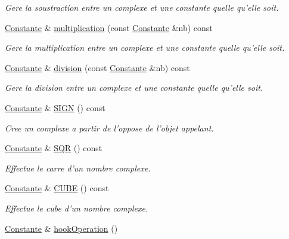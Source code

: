 \begin{DoxyCompactItemize}
\begin{DoxyCompactList}\small\item\em \-Gere la soustraction entre un complexe et une constante quelle qu'elle soit. \end{DoxyCompactList}\item 
\hyperlink{class_l_o21_1_1_constante}{\-Constante} \& \hyperlink{class_l_o21_1_1_complexe_aa52efe24813e29d3ae868404c1650cd3}{multiplication} (const \hyperlink{class_l_o21_1_1_constante}{\-Constante} \&nb) const 
\begin{DoxyCompactList}\small\item\em \-Gere la multiplication entre un complexe et une constante quelle qu'elle soit. \end{DoxyCompactList}\item 
\hyperlink{class_l_o21_1_1_constante}{\-Constante} \& \hyperlink{class_l_o21_1_1_complexe_abcf2883f67e57e3ad2b376ea39727fd3}{division} (const \hyperlink{class_l_o21_1_1_constante}{\-Constante} \&nb) const 
\begin{DoxyCompactList}\small\item\em \-Gere la division entre un complexe et une constante quelle qu'elle soit. \end{DoxyCompactList}\item 
\hyperlink{class_l_o21_1_1_constante}{\-Constante} \& \hyperlink{class_l_o21_1_1_complexe_aee563da58f38b8c0295133023f00e09e}{\-S\-I\-G\-N} () const 
\begin{DoxyCompactList}\small\item\em \-Cree un complexe a partir de l'oppose de l'objet appelant. \end{DoxyCompactList}\item 
\hyperlink{class_l_o21_1_1_constante}{\-Constante} \& \hyperlink{class_l_o21_1_1_complexe_a2289c8e181d428d842ed2228f146d1ab}{\-S\-Q\-R} () const 
\begin{DoxyCompactList}\small\item\em \-Effectue le carre d'un nombre complexe. \end{DoxyCompactList}\item 
\hyperlink{class_l_o21_1_1_constante}{\-Constante} \& \hyperlink{class_l_o21_1_1_complexe_af3cba1596766da1820b1e1a52768f145}{\-C\-U\-B\-E} () const 
\begin{DoxyCompactList}\small\item\em \-Effectue le cube d'un nombre complexe. \end{DoxyCompactList}\item 
\hyperlink{class_l_o21_1_1_constante}{\-Constante} \& \hyperlink{class_l_o21_1_1_complexe_a5d383443b7a02ccf583daaadcbff2449}{hook\-Operation} ()

\end{DoxyCompactItemize}
